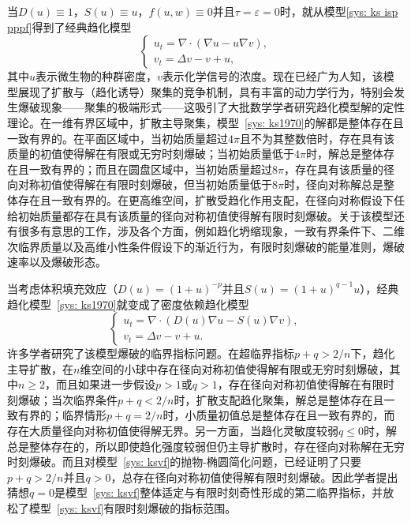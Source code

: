 \documentclass[12pt]{article}
\begin{document}
当$D(u)\equiv1$，$S(u)\equiv u$，$f(u,w)\equiv0$并且$\tau=\varepsilon=0$时，就从模型\eqref{sys: ks isp pppf}得到了经典趋化模型
\begin{equation}
    \label{sys: ks1970}
    \begin{cases}
        u_t = \nabla \cdot(\nabla u - u\nabla v), \\ 
        v_t = \Delta v - v + u,
    \end{cases}
\end{equation} 
其中$u$表示微生物的种群密度，$v$表示化学信号的浓度。现在已经广为人知，该模型展现了扩散与（趋化诱导）聚集的竞争机制，具有丰富的动力学行为，特别会发生爆破现象——聚集的极端形式——这吸引了大批数学学者研究趋化模型解的定性理论。在一维有界区域中，扩散主导聚集，模型~\eqref{sys: ks1970}的解都是整体存在且一致有界的。在平面区域中，当初始质量超过$4\pi$且不为其整数倍时，存在具有该质量的初值使得解在有限或无穷时刻爆破；当初始质量低于$4\pi$时，解总是整体存在且一致有界的；而且在圆盘区域中，当初始质量超过$8\pi$，存在具有该质量的径向对称初值使得解在有限时刻爆破，但当初始质量低于$8\pi$时，径向对称解总是整体存在且一致有界的。在更高维空间，扩散受趋化作用支配，在径向对称假设下任给初始质量都存在具有该质量的径向对称初值使得解有限时刻爆破。关于该模型还有很多有意思的工作，涉及各个方面，例如趋化坍缩现象，一致有界条件下、二维次临界质量以及高维小性条件假设下的渐近行为，有限时刻爆破的能量准则，爆破速率以及爆破形态。

当考虑体积填充效应（$D(u) = (1+u)^{-p}$并且$S(u)=(1+u)^{q-1}u$），经典趋化模型~\eqref{sys: ks1970}就变成了密度依赖趋化模型
\begin{equation}
    \label{sys: ksvf}
    \begin{cases}
        u_t = \nabla \cdot(D(u)\nabla u - S(u)\nabla v), \\ 
        v_t = \Delta v - v + u.
    \end{cases}
\end{equation} 
许多学者研究了该模型爆破的临界指标问题。在超临界指标$p+q>2/n$下，趋化主导扩散，在$n$维空间的小球中存在径向对称初值使得解有限或无穷时刻爆破，其中$n\geq2$，而且如果进一步假设$p>1$或$q>1$，存在径向对称初值使得解在有限时刻爆破；当次临界条件$p+q<2/n$时，扩散支配趋化聚集，解总是整体存在且一致有界的；临界情形$p+q=2/n$时，小质量初值总是整体存在且一致有界的，而存在大质量径向对称初值使得解无界。另一方面，当趋化灵敏度较弱$q\leq0$时，解总是整体存在的，所以即使趋化强度较弱但仍主导扩散时，存在径向对称解在无穷时刻爆破。而且对模型~\eqref{sys: ksvf}的抛物-椭圆简化问题，已经证明了只要$p+q>2/n$并且$q>0$，总存在径向对称初值使得解有限时刻爆破。因此学者提出猜想$q=0$是模型~\eqref{sys: ksvf}整体适定与有限时刻奇性形成的第二临界指标，并放松了模型~\eqref{sys: ksvf}有限时刻爆破的指标范围。
\end{document}
